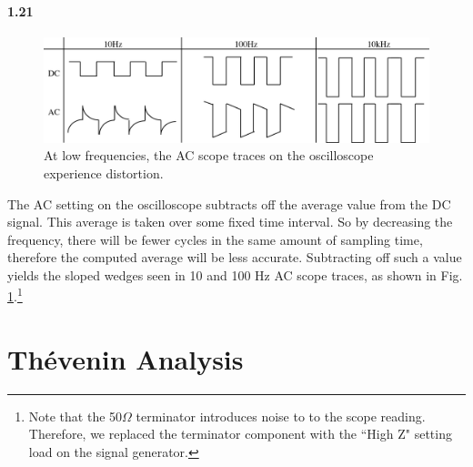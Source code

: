 \documentclass[authoryear, 12pt,5p, times]{elsarticle}
\begin{document}
\paragraph{\textbf{1.21}} 
\begin{figure}[t]
\includegraphics[width=\textwidth]{figure/ACweird}
\caption{At low frequencies, the AC scope traces on the oscilloscope experience distortion.}
\label{AC_weird}
\end{figure}
The AC setting on the oscilloscope subtracts off the average value from the DC signal. This average is taken over some fixed time interval. So by decreasing the frequency, there will be fewer cycles in the same amount of sampling time, therefore the computed average will be less accurate. Subtracting off such a value yields the sloped wedges seen in 10 and 100 Hz  AC scope traces, as shown in Fig. \ref{AC_weird}.\footnote{Note that the 50$\Omega$ terminator introduces noise to to the scope reading. Therefore, we replaced the terminator component with the ``High Z" setting load on the signal generator.}

\section{Thévenin Analysis}
\end{document}
